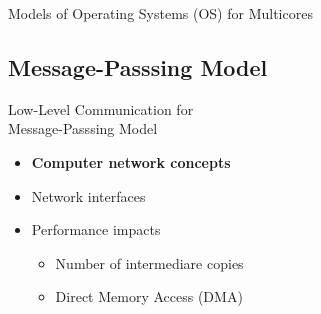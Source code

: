 \begin{frame}{Models of Operating Systems (OS) for Multicores}
		\end{frame}

	\subsection{Message-Passsing Model}

		\begin{frame}[fragile]{Low-Level Communication for\\Message-Passsing Model}
			\begin{itemize}
				\item \textbf{Computer network concepts}
			\end{itemize}

			\begin{itemize}
				\item Network interfaces
			\end{itemize}

			\begin{itemize}
				\item Performance impacts
				\begin{itemize}
					\item Number of intermediare copies
					\item Direct Memory Access (DMA)
				\end{itemize}
			\end{itemize}

		\end{frame}

